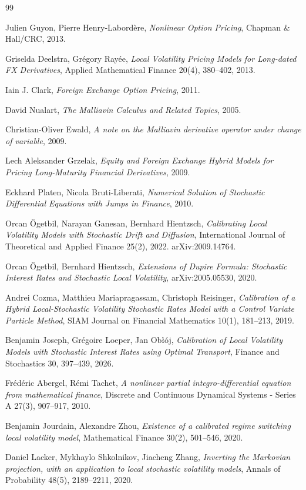 \begin{thebibliography}{99}

  Julien Guyon, Pierre Henry-Labord\`ere,
  \emph{Nonlinear Option Pricing},
  Chapman \& Hall/CRC, 2013.

  Griselda Deelstra, Gr\'egory Ray\'ee,
  \emph{Local Volatility Pricing Models for Long-dated FX Derivatives},
  Applied Mathematical Finance 20(4), 380--402, 2013.

  Iain J. Clark,
  \emph{Foreign Exchange Option Pricing},
  2011.

  David Nualart,
  \emph{The Malliavin Calculus and Related Topics},
  2005.

  Christian-Oliver Ewald,
  \emph{A note on the Malliavin derivative operator under change of variable},
  2009.

  Lech Aleksander Grzelak,
  \emph{Equity and Foreign Exchange Hybrid Models for Pricing Long-Maturity Financial Derivatives},
  2009.

  Eckhard Platen, Nicola Bruti-Liberati,
  \emph{Numerical Solution of Stochastic Differential Equations with Jumps in Finance},
  2010.

  Orcan \"Ogetbil, Narayan Ganesan, Bernhard Hientzsch,
  \emph{Calibrating Local Volatility Models with Stochastic Drift and Diffusion},
  International Journal of Theoretical and Applied Finance 25(2), 2022. arXiv:2009.14764.

  Orcan \"Ogetbil, Bernhard Hientzsch,
  \emph{Extensions of Dupire Formula: Stochastic Interest Rates and Stochastic Local Volatility},
  arXiv:2005.05530, 2020.

  Andrei Cozma, Matthieu Mariapragassam, Christoph Reisinger,
  \emph{Calibration of a Hybrid Local-Stochastic Volatility Stochastic Rates Model with a Control Variate Particle Method},
  SIAM Journal on Financial Mathematics 10(1), 181--213, 2019.

  Benjamin Joseph, Gr\'egoire Loeper, Jan Ob{\l}\'oj,
  \emph{Calibration of Local Volatility Models with Stochastic Interest Rates using Optimal Transport},
  Finance and Stochastics 30, 397--439, 2026.

  Fr\'ed\'eric Abergel, R\'emi Tachet,
  \emph{A nonlinear partial integro-differential equation from mathematical finance},
  Discrete and Continuous Dynamical Systems - Series A 27(3), 907--917, 2010.

  Benjamin Jourdain, Alexandre Zhou,
  \emph{Existence of a calibrated regime switching local volatility model},
  Mathematical Finance 30(2), 501--546, 2020.

  Daniel Lacker, Mykhaylo Shkolnikov, Jiacheng Zhang,
  \emph{Inverting the Markovian projection, with an application to local stochastic volatility models},
  Annals of Probability 48(5), 2189--2211, 2020.

\end{thebibliography}


